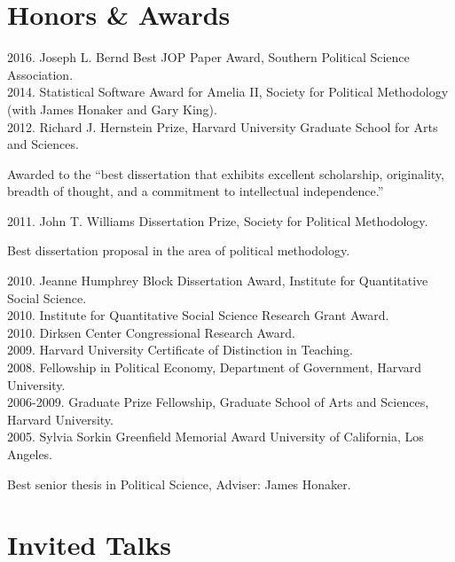 \documentclass[margin,line,12pt]{res}
\newenvironment{list1}{
  \begin{list}{\ding{113}}{%
      \setlength{\itemsep}{0in}
      \setlength{\parsep}{0in} \setlength{\parskip}{0in}
      \setlength{\topsep}{0in} \setlength{\partopsep}{0in} 
      \setlength{\leftmargin}{0.83 cm}}}{\end{list}}
\begin{document}
\begin{resume}
\section{\sc Honors \& Awards}
2016. Joseph L. Bernd Best JOP Paper Award, Southern Political Science Association.  \\
2014. Statistical Software Award for Amelia II, Society for Political Methodology (with James Honaker and Gary King).\\
2012. Richard J. Hernstein Prize, Harvard University Graduate School
for Arts and Sciences.
\begin{list1}
\item[] Awarded to the ``best dissertation that exhibits excellent scholarship, originality, breadth of 
thought, and a commitment to intellectual independence.''
\end{list1}
\vspace{-1em}
2011. John T. Williams Dissertation Prize, Society for Political Methodology.
\begin{list1} 
\item[] Best dissertation proposal in the area of political methodology.
\end{list1}
\vspace{-1em}
2010. Jeanne Humphrey Block Dissertation Award, Institute for Quantitative Social Science. \\
2010. Institute for Quantitative Social Science Research Grant Award.\\
2010. Dirksen Center Congressional Research Award.\\
2009. Harvard University Certificate of Distinction in Teaching. \\
2008. Fellowship in Political Economy, Department of Government, Harvard
University.\\
2006-2009. Graduate Prize Fellowship, Graduate School of Arts and Sciences, Harvard
University.\\
2005. Sylvia Sorkin Greenfield Memorial Award University of California, Los Angeles.
\begin{list1} 
\item[] Best senior thesis in Political Science, Adviser: James Honaker.
\end{list1}



\section{\textsf{\sc Invited Talks}}


\end{resume}
\end{document}
